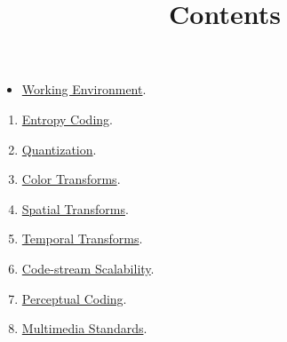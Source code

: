

\title{\SM{} \newline Contents}

\maketitle

\begin{itemize}
  \item \href{https://sistemas-multimedia.github.io/contents/working_environment}{Working Environment}. %
\end{itemize}
\begin{enumerate}
\item \href{https://sistemas-multimedia.github.io/contents/entropy_coding}{Entropy Coding}.  %
\item \href{https://sistemas-multimedia.github.io/contents/quantization}{Quantization}.  %
\item \href{https://sistemas-multimedia.github.io/contents/color_transforms}{Color Transforms}.  %
\item \href{https://sistemas-multimedia.github.io/contents/spatial_transforms}{Spatial Transforms}.  %
\item \href{https://sistemas-multimedia.github.io/contents/temporal_transforms}{Temporal Transforms}.  %
\item \href{https://sistemas-multimedia.github.io/contents/data_scalability}{Code-stream Scalability}.  %
\item \href{https://sistemas-multimedia.github.io/contents/perceptual_coding}{Perceptual Coding}.  %
\item \href{https://sistemas-multimedia.github.io/contents/standards}{Multimedia Standards}.  %
\end{enumerate}

